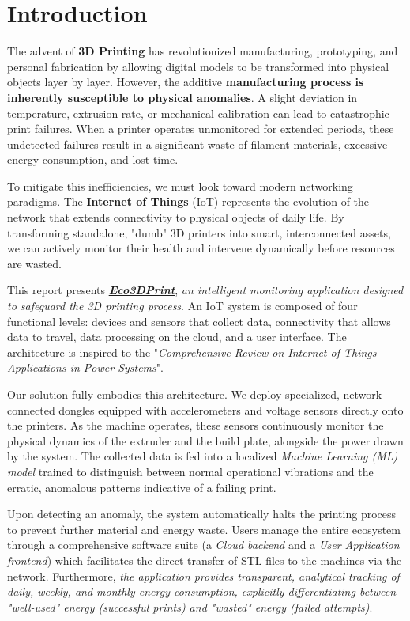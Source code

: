 \chapter{Introduction}
The advent of \textbf{3D Printing} has revolutionized manufacturing, prototyping, and personal fabrication by allowing digital models to be transformed into physical objects layer by layer. However, the additive \textbf{manufacturing process is inherently susceptible to physical anomalies}. A slight deviation in temperature, extrusion rate, or mechanical calibration can lead to catastrophic print failures. When a printer operates unmonitored for extended periods, these undetected failures result in a significant waste of filament materials, excessive energy consumption, and lost time.

To mitigate this inefficiencies, we must look toward modern networking paradigms. The \textbf{Internet of Things} (IoT) represents the evolution of the network that extends connectivity to physical objects of daily life. By transforming standalone, "dumb" 3D printers into smart, interconnected assets, we can actively monitor their health and intervene dynamically before resources are wasted.

\medspace

This report presents \textbf{\textit{\underline{Eco3DPrint}}}, \textit{an intelligent monitoring application designed to safeguard the 3D printing process}. An IoT system is composed of four functional levels: devices and sensors that collect data, connectivity that allows data to travel, data processing on the cloud, and a user interface. The architecture is inspired to the "\textit{Comprehensive Review on Internet of Things Applications in Power Systems}"\cite{iot_power}. 

Our solution fully embodies this architecture. We deploy specialized, network-connected dongles equipped with accelerometers and voltage sensors directly onto the printers. As the machine operates, these sensors continuously monitor the physical dynamics of the extruder and the build plate, alongside the power drawn by the system. The collected data is fed into a localized \textit{Machine Learning (ML) model} trained to distinguish between normal operational vibrations and the erratic, anomalous patterns indicative of a failing print.

Upon detecting an anomaly, the system automatically halts the printing process to prevent further material and energy waste. Users manage the entire ecosystem through a comprehensive software suite (a \textit{Cloud backend} and a \textit{User Application frontend}) which facilitates the direct transfer of STL files to the machines via the network. Furthermore, \textit{the application provides transparent, analytical tracking of daily, weekly, and monthly energy consumption, explicitly differentiating between "well-used" energy (successful prints) and "wasted" energy (failed attempts)}.

